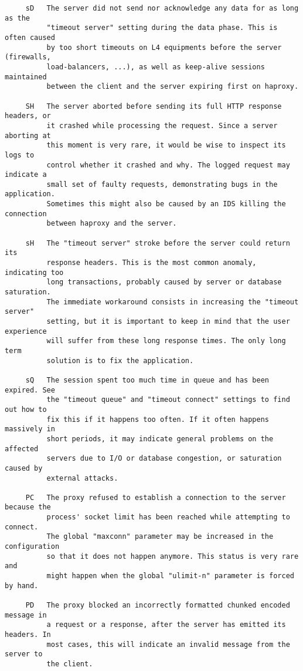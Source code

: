 \begin{verbatim}
     sD   The server did not send nor acknowledge any data for as long as the
          "timeout server" setting during the data phase. This is often caused
          by too short timeouts on L4 equipments before the server (firewalls,
          load-balancers, ...), as well as keep-alive sessions maintained
          between the client and the server expiring first on haproxy.

     SH   The server aborted before sending its full HTTP response headers, or
          it crashed while processing the request. Since a server aborting at
          this moment is very rare, it would be wise to inspect its logs to
          control whether it crashed and why. The logged request may indicate a
          small set of faulty requests, demonstrating bugs in the application.
          Sometimes this might also be caused by an IDS killing the connection
          between haproxy and the server.

     sH   The "timeout server" stroke before the server could return its
          response headers. This is the most common anomaly, indicating too
          long transactions, probably caused by server or database saturation.
          The immediate workaround consists in increasing the "timeout server"
          setting, but it is important to keep in mind that the user experience
          will suffer from these long response times. The only long term
          solution is to fix the application.

     sQ   The session spent too much time in queue and has been expired. See
          the "timeout queue" and "timeout connect" settings to find out how to
          fix this if it happens too often. If it often happens massively in
          short periods, it may indicate general problems on the affected
          servers due to I/O or database congestion, or saturation caused by
          external attacks.

     PC   The proxy refused to establish a connection to the server because the
          process' socket limit has been reached while attempting to connect.
          The global "maxconn" parameter may be increased in the configuration
          so that it does not happen anymore. This status is very rare and
          might happen when the global "ulimit-n" parameter is forced by hand.

     PD   The proxy blocked an incorrectly formatted chunked encoded message in
          a request or a response, after the server has emitted its headers. In
          most cases, this will indicate an invalid message from the server to
          the client.


\end{verbatim}
